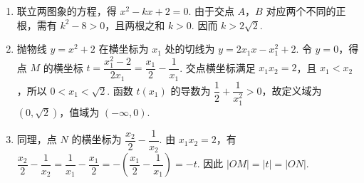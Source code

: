 \begin{solution}
\begin{enumerate}
\item 联立两图象的方程，得 \(x^2-kx+2=0\). 由于交点 \(A\)，\(B\) 对应两个不同的正根，需有 \(k^2-8>0\)，且两根之和 \(k>0\). 因而 \(k>2\sqrt2\).
\item 抛物线 \(y=x^2+2\) 在横坐标为 \(x_1\) 处的切线为 \(y=2x_1x-x_1^2+2\). 令 \(y=0\)，得点 \(M\) 的横坐标 \(t=\dfrac{x_1^2-2}{2x_1}=\dfrac{x_1}{2}-\dfrac1{x_1}\). 交点横坐标满足 \(x_1x_2=2\)，且 \(x_1<x_2\)，所以 \(0<x_1<\sqrt2\). 函数 \(t(x_1)\) 的导数为 \(\dfrac12+\dfrac1{x_1^2}>0\)，故定义域为 \((0,\sqrt2)\)，值域为 \((-\infty,0)\).
\item 同理，点 \(N\) 的横坐标为 \(\dfrac{x_2}{2}-\dfrac1{x_2}\). 由 \(x_1x_2=2\)，有 \(\dfrac{x_2}{2}-\dfrac1{x_2}=\dfrac1{x_1}-\dfrac{x_1}{2}=-\left(\dfrac{x_1}{2}-\dfrac1{x_1}\right)=-t\). 因此 \(|OM|=|t|=|ON|\).
\end{enumerate}
\end{solution}
